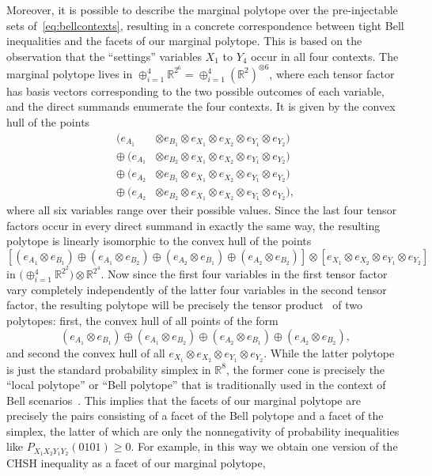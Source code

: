 {Moreover, it is possible to describe the marginal polytope over the pre-injectable sets of~\cref{eq:bellcontexts}, resulting in a concrete correspondence between tight Bell inequalities and the facets of our marginal polytope. This is based on the observation that the ``settings'' variables $X_1$ to $Y_4$ occur in all four contexts. The marginal polytope lives in $\oplus_{i=1}^4 \mathbb{R}^{2^6} = \oplus_{i=1}^4 (\mathbb{R}^2)^{\otimes 6}$, where each tensor factor has basis vectors corresponding to the two possible outcomes of each variable, and the direct summands enumerate the four contexts. It is given by the convex hull of the points
\begin{align*}
	(e_{A_1} & \otimes e_{B_1} \otimes e_{X_1} \otimes e_{X_2} \otimes e_{Y_1} \otimes e_{Y_2}) \\
	\oplus\: (e_{A_1} & \otimes e_{B_2} \otimes e_{X_1} \otimes e_{X_2} \otimes e_{Y_1} \otimes e_{Y_2}) \\
	\oplus\: (e_{A_2} & \otimes e_{B_1} \otimes e_{X_1} \otimes e_{X_2} \otimes e_{Y_1} \otimes e_{Y_2}) \\
	\oplus\: (e_{A_2} & \otimes e_{B_2} \otimes e_{X_1} \otimes e_{X_2} \otimes e_{Y_1} \otimes e_{Y_2}),
\end{align*}
where all six variables range over their possible values. Since the last four tensor factors occur in every direct summand in exactly the same way, the resulting polytope is linearly isomorphic to the convex hull of the points
\[
	\left[ (e_{A_1} \otimes e_{B_1}) \oplus (e_{A_1} \otimes e_{B_2}) \oplus (e_{A_2} \otimes e_{B_1}) \oplus (e_{A_2} \otimes e_{B_2})\right] \otimes \left[ e_{X_1} \otimes e_{X_2} \otimes e_{Y_1} \otimes e_{Y_2}\right]
\]
in $\big(\oplus_{i=1}^4 \mathbb{R}^{2^2}\big)\otimes \mathbb{R}^{2^4}$. Now since the first four variables in the first tensor factor vary completely independently of the latter four variables in the second tensor factor, the resulting polytope will be precisely the tensor product~\cite{namioka_tensor_1969,bogart_hom_2013} of two polytopes: first, the convex hull of all points of the form
\[
	(e_{A_1} \otimes e_{B_1}) \oplus (e_{A_1} \otimes e_{B_2}) \oplus (e_{A_2} \otimes e_{B_1}) \oplus (e_{A_2} \otimes e_{B_2}),
\]
and second the convex hull of all $e_{X_1} \otimes e_{X_2} \otimes e_{Y_1} \otimes e_{Y_2}$. While the latter polytope is just the standard probability simplex in $\mathbb{R}^8$, the former cone is precisely the ``local polytope'' or ``Bell polytope'' that is traditionally used in the context of Bell scenarios~\cite[Sec.~II.B]{Brunner2013Bell}. This implies that the facets of our marginal polytope are precisely the pairs consisting of a facet of the Bell polytope and a facet of the simplex, the latter of which are only the nonnegativity of probability inequalities like $P_{X_1X_2Y_1Y_2}(0101)\geq 0$. For example, in this way we obtain one version of the CHSH inequality as a facet of our marginal polytope,
}
